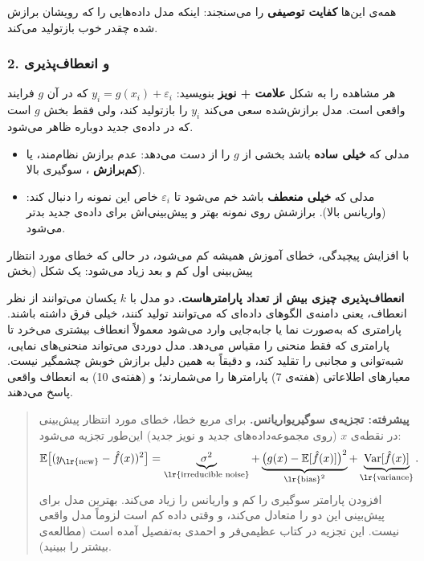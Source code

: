 همه‌ی این‌ها \textbf{کفایت توصیفی} را می‌سنجند: اینکه مدل داده‌هایی را که
رویشان برازش شده چقدر خوب بازتولید می‌کند.

\subsubsection{\texorpdfstring{2.  و
انعطاف‌پذیری}{2. overfitting و انعطاف‌پذیری}}

هر مشاهده را به شکل \textbf{علامت + نویز} بنویسید:
\(y_i = g(x_i) + \varepsilon_i\) که در آن \(g\) فرایند واقعی است. مدل
برازش‌شده سعی می‌کند \(y_i\) را بازتولید کند، ولی فقط بخش \(g\) است که در
داده‌ی جدید دوباره ظاهر می‌شود.

\begin{itemize}
\tightlist
\item
  مدلی که \textbf{خیلی ساده} باشد بخشی از \(g\) را از دست می‌دهد: عدم
  برازش نظام‌مند، یا \textbf{کم‌برازش} ، سوگیری بالا).
\item
  مدلی که \textbf{خیلی منعطف} باشد خم می‌شود تا \(\varepsilon_i\) خاص این
  نمونه را دنبال کند: \textbf{} (واریانس بالا). برازشش
  روی نمونه بهتر و پیش‌بینی‌اش برای داده‌ی جدید بدتر می‌شود.
\end{itemize}

با افزایش پیچیدگی، خطای آموزش همیشه کم می‌شود، در حالی که خطای مورد
انتظار پیش‌بینی اول کم و بعد زیاد می‌شود: یک شکل  (بخش 

\textbf{انعطاف‌پذیری چیزی بیش از تعداد پارامترهاست.} دو مدل با \(k\)
یکسان می‌توانند از نظر انعطاف، یعنی دامنه‌ی الگوهای داده‌ای که می‌توانند
تولید کنند، خیلی فرق داشته باشند. پارامتری که به‌صورت نما یا جابه‌جایی
وارد می‌شود معمولاً انعطاف بیشتری می‌خرد تا پارامتری که فقط منحنی را مقیاس
می‌دهد. مدل دوردی می‌تواند منحنی‌های نمایی، شبه‌توانی و مجانبی را تقلید کند،
و دقیقاً به همین دلیل برازش خوبش چشمگیر نیست. معیارهای اطلاعاتی (هفته‌ی 7)
پارامترها را می‌شمارند؛  و  (هفته‌ی
10) به انعطاف واقعی پاسخ می‌دهند.

\begin{quote}
\textbf{پیشرفته: تجزیه‌ی سوگیری\lr{--}واریانس.} برای مربع خطا، خطای مورد
انتظار پیش‌بینی در نقطه‌ی \(x\) (روی مجموعه‌داده‌های جدید و نویز جدید)
این‌طور تجزیه می‌شود:
\[\mathbb{E}\big[(y_{\text{\lr{new}}} - \hat f(x))^2\big] = \underbrace{\sigma^2}_{\text{\lr{irreducible noise}}} + \underbrace{\big(g(x) - \mathbb{E}[\hat f(x)]\big)^2}_{\text{\lr{bias}}^2} + \underbrace{\mathrm{Var}[\hat f(x)]}_{\text{\lr{variance}}}.\]
افزودن پارامتر سوگیری را کم و واریانس را زیاد می‌کند. بهترین مدل برای
پیش‌بینی این دو را متعادل می‌کند، و وقتی داده کم است لزوماً مدل واقعی نیست.
این تجزیه در کتاب عظیمی‌فر و احمدی به‌تفصیل آمده است (مطالعه‌ی بیشتر را
ببینید).
\end{quote}

